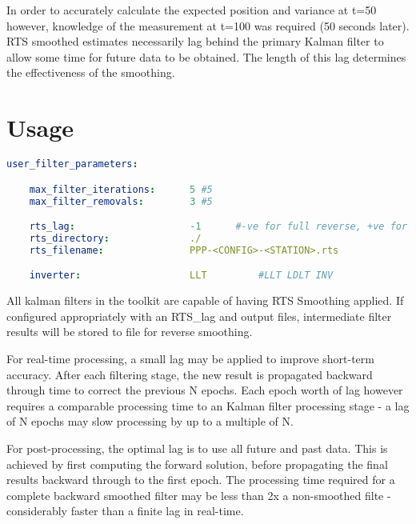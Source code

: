 In order to accurately calculate the expected position and variance at t=50 however, knowledge of the measurement at t=100 was required (50 seconds later). RTS smoothed estimates necessarily lag behind the primary Kalman filter to allow some time for future data to be obtained. The length of this lag determines the effectiveness of the smoothing.

\section{Usage}

\begin{lstlisting}[language=yaml,caption=RTS Configuration]
user_filter_parameters:

    max_filter_iterations:      5 #5
    max_filter_removals:        3 #5

    rts_lag:                    -1      #-ve for full reverse, +ve for limited epochs
    rts_directory:              ./
    rts_filename:               PPP-<CONFIG>-<STATION>.rts

    inverter:                   LLT         #LLT LDLT INV

\end{lstlisting}

All kalman filters in the toolkit are capable of having RTS Smoothing applied. If configured appropriately with an RTS\_lag and output files, intermediate filter results will be stored to file for reverse smoothing.

For real-time processing, a small lag may be applied to improve short-term accuracy. After each filtering stage, the new result is propagated backward through time to correct the previous N epochs. Each epoch worth of lag however requires a comparable processing time to an Kalman filter processing stage - a lag of N epochs may slow processing by up to a multiple of N.

For post-processing, the optimal lag is to use all future and past data. This is achieved by first computing the forward solution, before propagating the final results backward through to the first epoch. The processing time required for a complete backward smoothed filter may be less than 2x a non-smoothed filte - considerably faster than a finite lag in real-time.